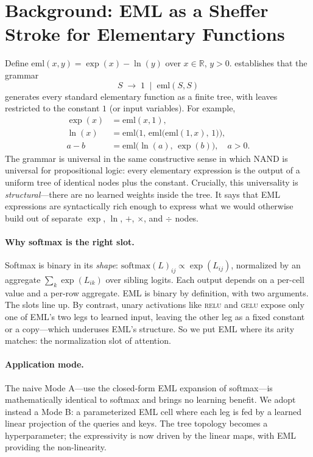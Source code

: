 \documentclass{article}
\begin{document}
\section{Background: EML as a Sheffer Stroke for Elementary Functions}

Define $\mathrm{eml}(x, y) = \exp(x) - \ln(y)$ over $x \in \mathbb{R}$,
$y > 0$. \citet{odrzywolek2026eml} establishes that the grammar
\[
  S \;\to\; 1 \;\mid\; \mathrm{eml}(S, S)
\]
generates every standard elementary function as a finite tree, with leaves
restricted to the constant $1$ (or input variables). For example,
\begin{align}
  \exp(x) &= \mathrm{eml}(x, 1), \\
  \ln(x)  &= \mathrm{eml}\bigl(1,\,\mathrm{eml}\bigl(\mathrm{eml}(1, x),\,1\bigr)\bigr), \\
  a - b   &= \mathrm{eml}\bigl(\ln(a),\,\exp(b)\bigr), \quad a > 0.
\end{align}
The grammar is universal in the same constructive sense in which NAND is
universal for propositional logic: every elementary expression is the
output of a uniform tree of identical nodes plus the constant. Crucially,
this universality is \emph{structural}---there are no learned weights
inside the tree. It says that EML expressions are syntactically rich
enough to express what we would otherwise build out of separate
$\exp$, $\ln$, $+$, $\times$, and $\div$ nodes.

\paragraph{Why softmax is the right slot.} Softmax is binary in its
\emph{shape}: $\mathrm{softmax}(L)_{ij} \propto \exp(L_{ij})$, normalized
by an aggregate $\sum_k \exp(L_{ik})$ over sibling logits. Each output
depends on a per-cell value and a per-row aggregate. EML is binary by
definition, with two arguments. The slots line up. By contrast, unary
activations like \textsc{relu} and \textsc{gelu} expose only one of EML's
two legs to learned input, leaving the other leg as a fixed constant or a
copy---which underuses EML's structure. So we put EML where its arity
matches: the normalization slot of attention.

\paragraph{Application mode.} The naive Mode A---use the closed-form
EML expansion of softmax---is mathematically identical to softmax and
brings no learning benefit. We adopt instead a Mode B: a parameterized
EML cell where each leg is fed by a learned linear projection of the
queries and keys. The tree topology becomes a hyperparameter; the
expressivity is now driven by the linear maps, with EML providing the
non-linearity.
\end{document}
